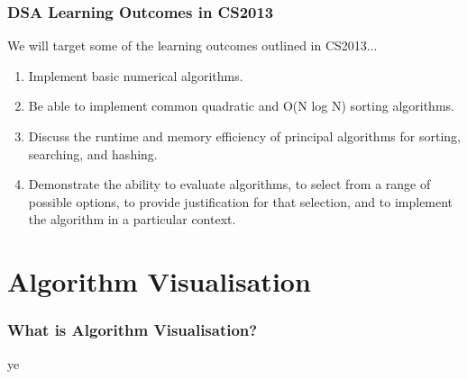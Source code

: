 \documentclass{beamer}
\begin{document}
\begin{frame}
  \frametitle{DSA Learning Outcomes in CS2013}
  We will target some of the learning outcomes outlined in CS2013...
  \begin{enumerate}
    \item Implement basic numerical algorithms.
    \item Be able to implement common quadratic and O(N log N) sorting algorithms.
    \item Discuss the runtime and memory efficiency of principal algorithms for sorting, searching, and hashing.
    \item Demonstrate the ability to evaluate algorithms, to select from a range of possible options, to provide justification for that selection, and to implement the algorithm in a particular context. 
  \end{enumerate}
\end{frame}
\section{Algorithm Visualisation}
\begin{frame}
  \frametitle{What is Algorithm Visualisation?}
  ye
\end{frame}
\end{document}
